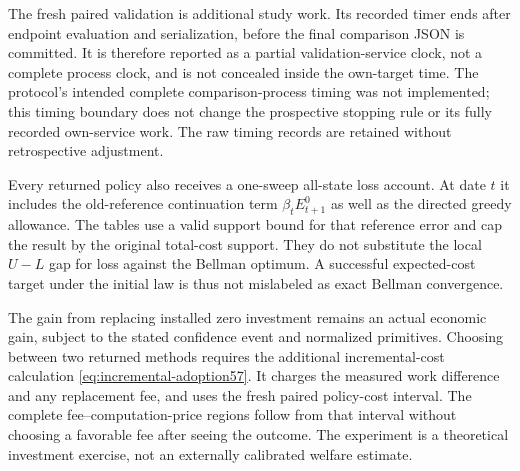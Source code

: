 The fresh paired validation is additional study work. Its recorded timer ends after endpoint evaluation and serialization, before the final comparison JSON is committed. It is therefore reported as a partial validation-service clock, not a complete process clock, and is not concealed inside the own-target time. The protocol's intended complete comparison-process timing was not implemented; this timing boundary does not change the prospective stopping rule or its fully recorded own-service work. The raw timing records are retained without retrospective adjustment.

Every returned policy also receives a one-sweep all-state loss account. At date $t$ it includes the old-reference continuation term $\beta_tE_{t+1}^{0}$ as well as the directed greedy allowance. The tables use a valid support bound for that reference error and cap the result by the original total-cost support. They do not substitute the local $U-L$ gap for loss against the Bellman optimum. A successful expected-cost target under the initial law is thus not mislabeled as exact Bellman convergence.

The gain from replacing installed zero investment remains an actual economic gain, subject to the stated confidence event and normalized primitives. Choosing between two returned methods requires the additional incremental-cost calculation \eqref{eq:incremental-adoption57}. It charges the measured work difference and any replacement fee, and uses the fresh paired policy-cost interval. The complete fee--computation-price regions follow from that interval without choosing a favorable fee after seeing the outcome. The experiment is a theoretical investment exercise, not an externally calibrated welfare estimate.
